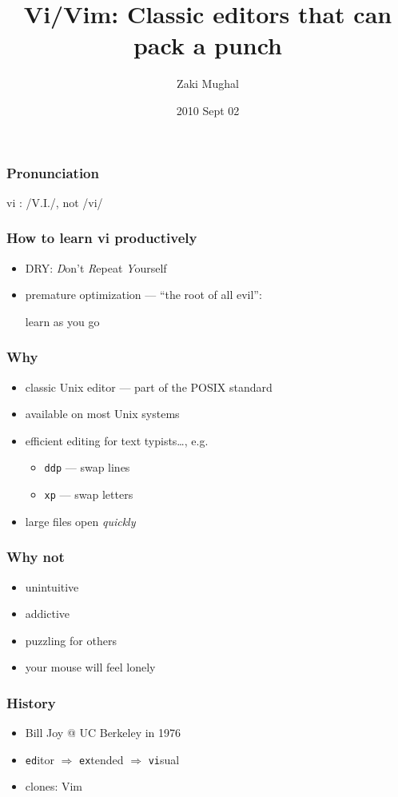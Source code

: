\documentclass[%
        hyperref={%
                pdfauthor={Zakariyya Mughal},%
                pdfpagemode={None},pdfpagelayout={SinglePage}}%
        xcolor={x11names},%
]{beamer}
\title[Vi/Vim]{Vi/Vim: Classic editors that can pack a punch}
\author{Zaki Mughal}
\institute{University of Houston:\\CougarCS}
\date{2010 Sept 02}
\newenvironment{indented}{\begin{adjustwidth}{1.5em}{}}{\end{adjustwidth}}
\begin{document}
\frame{\titlepage}


\begin{frame}
\frametitle{Pronunciation}
\begin{center}
\Huge
vi : /V.I./, not /vi/
\end{center}
\end{frame}

\begin{frame}
\frametitle{How to learn vi productively}
\begin{itemize}
\pause \item DRY: \emph{D}on't \emph{R}epeat \emph{Y}ourself
\pause \item premature optimization --- ``the root of all evil'':
\pause \par\begin{indented}learn as you go\end{indented}
\end{itemize}
\end{frame}

\begin{frame}[fragile]
\frametitle{Why}
\begin{itemize}
\pause \item classic Unix editor --- part of the POSIX standard
\pause \item available on most Unix systems
\pause \item efficient editing for text typists\ldots, e.g.
	\begin{itemize}
	\item \Verb+ddp+ --- swap lines
	\item \Verb+xp+ --- swap letters
	\end{itemize}
\pause \item large files open \emph{quickly}
\end{itemize}
\end{frame}

\begin{frame}
\frametitle{Why not}
\begin{itemize}
\item unintuitive
\item addictive
\item puzzling for others
\pause
\item your mouse will feel lonely
\end{itemize}
\end{frame}

\begin{frame}
\frametitle{History}
\begin{itemize}
\item Bill Joy @ UC Berkeley in 1976
\item \Verb+ed+itor $\Rightarrow$ \Verb+ex+tended $\Rightarrow$
\Verb+vi+sual
\item clones: Vim
\end{itemize}
\end{frame}
\end{document}
